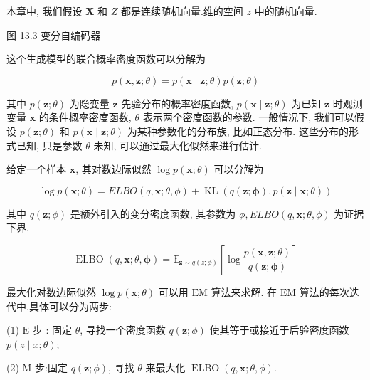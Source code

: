 \documentclass[10pt]{article}
\begin{document}
本章中, 我们假设 $\boldsymbol{X}$ 和 $Z$ 都是连续随机向量.维的空间 $z$ 中的随机向量.



图 13.3 变分自编码器

这个生成模型的联合概率密度函数可以分解为


\begin{equation*}
p(\boldsymbol{x}, \boldsymbol{z} ; \theta)=p(\boldsymbol{x} \mid \boldsymbol{z} ; \theta) p(\boldsymbol{z} ; \theta) \tag{13.2}
\end{equation*}


其中 $p(\boldsymbol{z} ; \theta)$ 为隐变量 $\boldsymbol{z}$ 先验分布的概率密度函数, $p(\boldsymbol{x} \mid \boldsymbol{z} ; \theta)$ 为已知 $\boldsymbol{z}$ 时观测变量 $\boldsymbol{x}$ 的条件概率密度函数, $\theta$ 表示两个密度函数的参数. 一般情况下, 我们可以假设 $p(\boldsymbol{z} ; \theta)$ 和 $p(\boldsymbol{x} \mid \boldsymbol{z} ; \theta)$ 为某种参数化的分布族, 比如正态分布. 这些分布的形式已知, 只是参数 $\theta$ 未知, 可以通过最大化似然来进行估计.

给定一个样本 $\boldsymbol{x}$, 其对数边际似然 $\log p(\boldsymbol{x} ; \theta)$ 可以分解为


\begin{equation*}
\log p(\boldsymbol{x} ; \theta)=E L B O(q, \boldsymbol{x} ; \theta, \phi)+\operatorname{KL}(q(\boldsymbol{z} ; \boldsymbol{\phi}), p(\boldsymbol{z} \mid \boldsymbol{x} ; \theta)) \tag{13.3}
\end{equation*}


其中 $q(\boldsymbol{z} ; \phi)$ 是额外引入的变分密度函数, 其参数为 $\phi, E L B O(q, \boldsymbol{x} ; \theta, \phi)$ 为证据下界,


\begin{equation*}
\operatorname{ELBO}(q, \boldsymbol{x} ; \theta, \boldsymbol{\phi})=\mathbb{E}_{\boldsymbol{z} \sim q(z ; \phi)}\left[\log \frac{p(\boldsymbol{x}, \boldsymbol{z} ; \theta)}{q(\boldsymbol{z} ; \boldsymbol{\phi})}\right] \tag{13.4}
\end{equation*}


最大化对数边际似然 $\log p(\boldsymbol{x} ; \theta)$ 可以用 $\mathrm{EM}$ 算法来求解. 在 $\mathrm{EM}$ 算法的每次迭代中,具体可以分为两步:

(1) $\mathrm{E}$ 步 : 固定 $\theta$, 寻找一个密度函数 $q(\boldsymbol{z} ; \phi)$ 使其等于或接近于后验密度函数 $p(z \mid x ; \theta)$;

(2) $\mathrm{M}$ 步:固定 $q(\boldsymbol{z} ; \phi)$, 寻找 $\theta$ 来最大化 $\operatorname{ELBO}(q, \boldsymbol{x} ; \theta, \phi)$.
\end{document}
